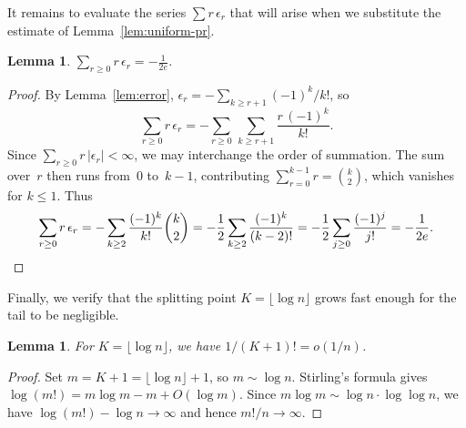 \documentclass[a4paper,11pt,UKenglish]{article}
\newtheorem{lemma}[theorem]{Lemma}
\theoremstyle{definition}
\begin{document}
It remains to evaluate the series $\sum r\,\epsilon_r$ that will
arise when we substitute the estimate of
Lemma~\ref{lem:uniform-pr}.

\begin{lemma}\label{lem:series-eval}
$\displaystyle\sum_{r \geq 0} r\,\epsilon_r = -\frac{1}{2e}$.
\end{lemma}

\begin{proof}
By Lemma~\ref{lem:error},
$\epsilon_r = -\sum_{k \geq r+1} (-1)^k/k!$, so
\[
  \sum_{r \geq 0} r\,\epsilon_r
  = -\sum_{r \geq 0}\, \sum_{k \geq r+1}
    \frac{r\,(-1)^k}{k!}.
\]
Since $\sum_{r \geq 0} r\,|\epsilon_r| < \infty$, we may
interchange the order of summation.
The sum over~$r$ then runs from~$0$ to~$k-1$, contributing
$\sum_{r=0}^{k-1} r = \binom{k}{2}$, which vanishes for $k \leq 1$.
Thus
\[
  \sum_{r \geq 0} r\,\epsilon_r
  = -\sum_{k \geq 2} \frac{(-1)^k}{k!} \binom{k}{2}
  = -\frac{1}{2}\sum_{k \geq 2} \frac{(-1)^k}{(k-2)!}
  = -\frac{1}{2}\sum_{j \geq 0} \frac{(-1)^j}{j!} = -\frac{1}{2e}.\qedhere
\]
\end{proof}

Finally, we verify that the splitting point $K = \lfloor \log n \rfloor$
grows fast enough for the tail to be negligible.

\begin{lemma}\label{lem:factorial-tail}
For $K = \lfloor \log n \rfloor$, we have
$1/(K+1)! = o(1/n)$.
\end{lemma}

\begin{proof}
Set $m = K + 1 = \lfloor \log n \rfloor + 1$, so
$m \sim \log n$.  Stirling's formula gives
$\log(m!) = m\log m - m + O(\log m)$.
Since $m\log m \sim \log n\cdot\log\log n$, we have
$\log(m!) - \log n \to \infty$ and hence $m!/n \to \infty$.
\end{proof}
\end{document}
